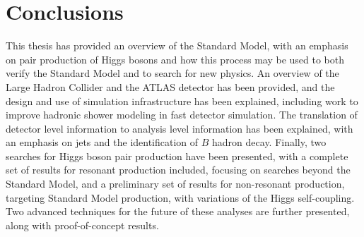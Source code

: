\chapter{Conclusions}
\label{chap:conclusions}

This thesis has provided an overview of the Standard Model, with an emphasis on pair production of Higgs bosons and how this process may be used to both verify the Standard Model and to search for new physics. An overview of the Large Hadron 
Collider and the ATLAS detector has been provided, and the design and use of simulation infrastructure has been explained, 
including work to improve hadronic shower modeling in fast detector simulation. The translation of detector level 
information to analysis level information has been explained, with an emphasis on jets and the identification of $B$ hadron 
decay. Finally, two searches for Higgs boson pair production have been presented, with a complete set of results for 
resonant production included, focusing on searches beyond the Standard Model, and a preliminary set of results for 
non-resonant production, targeting Standard Model production, with variations of the Higgs self-coupling. Two advanced 
techniques for the future of these analyses are further presented, along with proof-of-concept results.
